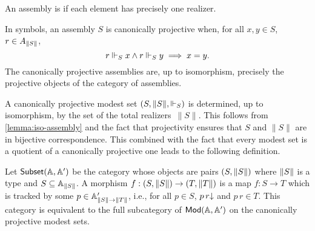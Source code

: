 
\begin{definition}
  An assembly is  if each element has
  precisely one realizer.
\end{definition}

\noindent
In symbols, an assembly $S$ is canonically projective when, for all
$x, y \in S$, $r \in A_{\T{S}}$,
%
\begin{equation*}
  r \rz[S] x \land r \rz[S] y \implies x = y.
\end{equation*}
%
The canonically projective assemblies are, up to isomorphism,
precisely the projective objects of the category of assemblies.

A canonically projective modest set $(S, \T{S}, {\rz[S]})$ is determined,
up to isomorphism, by the set of the total realizers~$\|S\|$. This
follows from \cref{lemma:iso-assembly} and the fact that
projectivity ensures that $S$ and $\|S\|$ are in bijective
correspondence. This combined with the fact that every modest set is a
quotient of a canonically projective one leads to the following
definition.

Let $\subcat{\AA, \subAA}$ be the category whose objects are pairs
$(S, \T{S})$ where $\T{S}$ is a type and $S \subseteq \Atyp{\T{S}}$. A morphism
$f : (S, \T{S}) \to (T, \T{T})$ is a map $f : S \to T$ which is tracked by
some $p \in \subAtyp{\T{S} \to \T{T}}$, i.e., for all $p \in S$,
$\defined{p\,r}$ and $p\,r \in T$. This category is equivalent to the
full subcategory of $\Mod{\AA, \subAA}$ on the canonically projective
modest sets.



